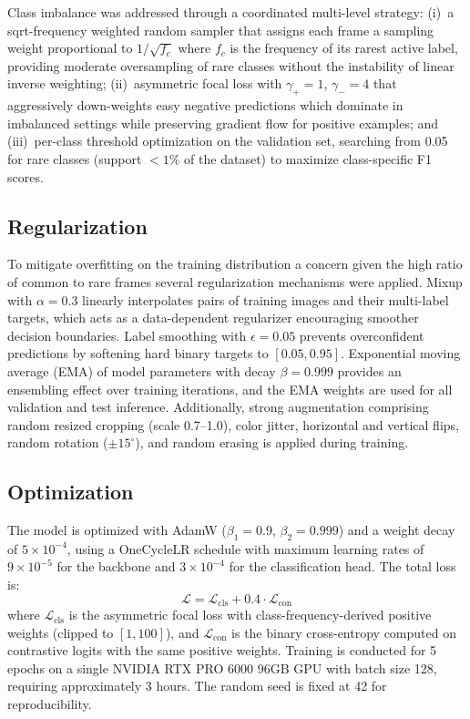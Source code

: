 \documentclass[12pt]{article}
\begin{document}
Class imbalance was addressed through a coordinated multi-level strategy: (i)~a sqrt-frequency weighted random sampler that assigns each frame a sampling weight proportional to $1/\sqrt{f_c}$ where $f_c$ is the frequency of its rarest active label, providing moderate oversampling of rare classes without the instability of linear inverse weighting; (ii)~asymmetric focal loss \cite{Ridnik2021asl} with $\gamma_+ = 1$, $\gamma_- = 4$ that aggressively down-weights easy negative predictions which dominate in imbalanced settings while preserving gradient flow for positive examples; and (iii)~per-class threshold optimization on the validation set, searching from 0.05 for rare classes (support $< 1\%$ of the dataset) to maximize class-specific F1 scores.

\subsection{Regularization}

To mitigate overfitting on the training distribution a concern given the high ratio of common to rare frames several regularization mechanisms were applied. Mixup \cite{Zhang2018mixup} with $\alpha = 0.3$ linearly interpolates pairs of training images and their multi-label targets, which acts as a data-dependent regularizer encouraging smoother decision boundaries. Label smoothing \cite{Szegedy2016labelsmoothing} with $\epsilon = 0.05$ prevents overconfident predictions by softening hard binary targets to $[0.05, 0.95]$. Exponential moving average (EMA) of model parameters with decay $\beta = 0.999$ provides an ensembling effect over training iterations, and the EMA weights are used for all validation and test inference. Additionally, strong augmentation comprising random resized cropping (scale 0.7--1.0), color jitter, horizontal and vertical flips, random rotation ($\pm 15^{\circ}$), and random erasing is applied during training.

\subsection{Optimization}

The model is optimized with AdamW ($\beta_1=0.9$, $\beta_2=0.999$) and a weight decay of $5\times10^{-4}$, using a OneCycleLR schedule with maximum learning rates of $9\times10^{-5}$ for the backbone and $3\times10^{-4}$ for the classification head. The total loss is:
\begin{equation}
    \mathcal{L} = \mathcal{L}_{\text{cls}} + 0.4 \cdot \mathcal{L}_{\text{con}}
\end{equation}
where $\mathcal{L}_{\text{cls}}$ is the asymmetric focal loss with class-frequency-derived positive weights (clipped to $[1, 100]$), and $\mathcal{L}_{\text{con}}$ is the binary cross-entropy computed on contrastive logits with the same positive weights. Training is conducted for 5 epochs on a single NVIDIA RTX PRO 6000 96GB GPU with batch size 128, requiring approximately 3 hours. The random seed is fixed at 42 for reproducibility.
\end{document}
